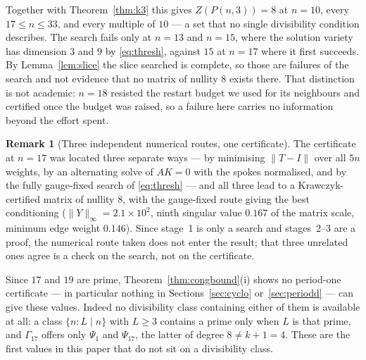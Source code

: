 \documentclass[11pt]{article}
\theoremstyle{definition}
\newtheorem{remark}[theorem]{Remark}
\begin{document}
\noindent
Together with Theorem~\ref{thm:k3} this gives $Z(P(n,3))=8$ at
$n=10$, every $17\le n\le33$, and every multiple of $10$ --- a set that no
single divisibility condition describes. The search fails only at $n=13$ and
$n=15$, where the solution variety has dimension $3$ and $9$ by
\eqref{eq:thresh}, against $15$ at $n=17$ where it first succeeds. By
Lemma~\ref{lem:slice} the slice searched is complete, so those are failures of
the search and not evidence that no matrix of nullity $8$ exists there. That
distinction is not academic: $n=18$ resisted the restart budget we used for its
neighbours and certified once the budget was raised, so a failure here carries
no information beyond the effort spent.

\begin{remark}[Three independent numerical routes, one certificate]
The certificate at $n=17$ was located three separate ways --- by minimising
$\|T-I\|$ over all $5n$ weights, by an alternating solve of $AK=0$ with the
spokes normalised, and by the fully gauge-fixed search of \eqref{eq:thresh} ---
and all three lead to a Krawczyk-certified matrix of nullity $8$, with the
gauge-fixed route giving the best conditioning ($\|Y\|_\infty=2.1\times10^{2}$,
ninth singular value $0.167$ of the matrix scale, minimum edge weight $0.146$).
Since stage~1 is only a search and stages~2--3 are a proof, the numerical route
taken does not enter the result; that three unrelated ones agree is a check on
the search, not on the certificate.
\end{remark}

\noindent
Since $17$ and $19$ are prime, Theorem~\ref{thm:congbound}(i) shows no
period-one certificate --- in particular nothing in Sections~\ref{sec:cyclo}
or~\ref{sec:periodd} --- can give these values. Indeed no divisibility class
containing either of them is available at all: a class $\{n:L\mid n\}$ with
$L\ge3$ contains a prime only when $L$ is that prime, and $\Gamma_{17}$ offers
only $\Psi_1$ and $\Psi_{17}$, the latter of degree $8\ne k+1=4$. These are the
first values in this paper that do not sit on a divisibility class.
\end{document}
